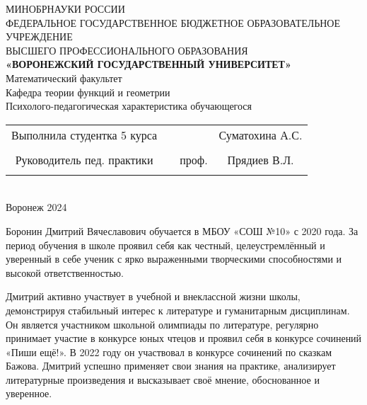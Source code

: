 \documentclass[a4paper,12pt]{article}
\begin{document}
\begin{center}
	\hfill \break
	\large{МИНОБРНАУКИ РОССИИ}\\
	\footnotesize{ФЕДЕРАЛЬНОЕ ГОСУДАРСТВЕННОЕ БЮДЖЕТНОЕ ОБРАЗОВАТЕЛЬНОЕ УЧРЕЖДЕНИЕ}\\
	\footnotesize{ВЫСШЕГО ПРОФЕССИОНАЛЬНОГО ОБРАЗОВАНИЯ}\\
	\small{\textbf{«ВОРОНЕЖСКИЙ ГОСУДАРСТВЕННЫЙ УНИВЕРСИТЕТ»}}\\
	\hfill \break
	\normalsize{Математический факультет}\\
	\hfill \break
	\normalsize{Кафедра теории функций и геометрии}\\
	\hfill\break
	\hfill \break
	\hfill \break
	\hfill \break
	\hfill \break
	\hfill \break
	\hfill \break
	\hfill \break
	\hfill \break
	\large{Психолого-педагогическая характеристика обучающегося
	}\\
	\hfill \break
	\hfill \break
	\hfill \break
\hfill \break
\hfill \break
\hfill \break
\hfill \break
\hfill \break
\hfill \break
\normalsize{
	\begin{tabular}{cccc}
		Выполнила студентка 5 курса & \underline{\hspace{3cm}} &                       &  Суматохина А.С. \\\\
		Руководитель пед. практики & \underline{\hspace{3cm}} & проф. & Прядиев В.Л.    \\\\
	\end{tabular}
}\\
\hfill \break
\hfill \break
\hfill \break
\hfill \break
\hfill \break
\hfill \break
\hfill \break
\hfill \break
\hfill \break
\hfill \break
\hfill \break
\hfill \break
\hfill \break
\hfill \break
\hfill \break
\hfill \break
\hfill \break
Воронеж 2024 \end{center}
\newpage

Боронин Дмитрий Вячеславович обучается в МБОУ «СОШ №10» с 2020 года. За период обучения в школе проявил себя как честный, целеустремлённый и уверенный в себе ученик с ярко выраженными творческими способностями и высокой ответственностью.

Дмитрий активно участвует в учебной и внеклассной жизни школы, демонстрируя стабильный интерес к литературе и гуманитарным дисциплинам. Он является участником школьной олимпиады по литературе, регулярно принимает участие в конкурсе юных чтецов и проявил себя в конкурсе сочинений «Пиши ещё!». В 2022 году он участвовал в конкурсе сочинений по сказкам Бажова. Дмитрий успешно применяет свои знания на практике, анализирует литературные произведения и высказывает своё мнение, обоснованное и уверенное.
\end{document}
